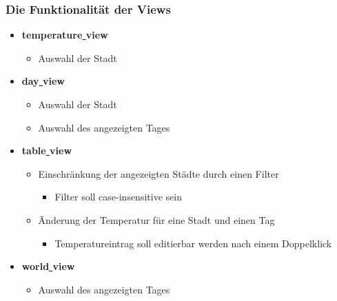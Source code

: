 \begin{frame}
  \frametitle{Die Funktionalit\"at der Views}
  \begin{itemize}
    \item \textbf{temperature\underline{ }view}
    \begin{itemize}
      \item Auswahl der Stadt
    \end{itemize}
    \item \textbf{day\underline{ }view}
    \begin{itemize}
      \item Auswahl der Stadt
      \item Auswahl des angezeigten Tages
    \end{itemize}
    \item \textbf{table\underline{ }view}
    \begin{itemize}
      \item Einschr\"ankung der angezeigten St\"adte durch einen Filter
      \begin{itemize}
        \item Filter soll case-insensitive sein
      \end{itemize}
      \item \"Anderung der Temperatur f\"ur eine Stadt und einen Tag
      \begin{itemize}
        \item Temperatureintrag soll editierbar werden nach einem Doppelklick
      \end{itemize}
    \end{itemize}
    \item \textbf{world\underline{ }view}
    \begin{itemize}
      \item Auswahl des angezeigten Tages
    \end{itemize}
  \end{itemize}
\end{frame}
